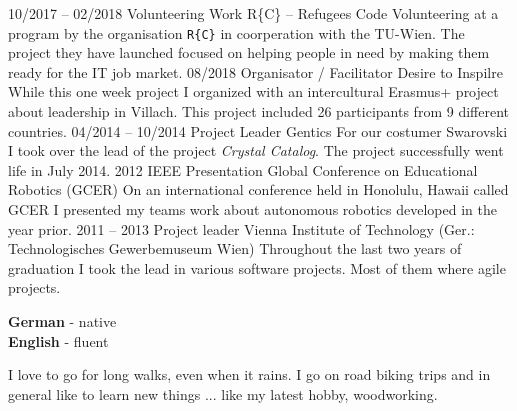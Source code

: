 \documentclass[9pt]{developercv} %
\begin{document}

\begin{entrylist}
	\entry
	{10/2017 -- 02/2018}
	{Volunteering Work}
	{R\{C\} -- Refugees Code}
	{Volunteering at a program by the organisation \texttt{R\{C\}} in coorperation with the TU-Wien. The project they have launched focused on helping people in need by making them ready for the IT job market.}
	\entry
	{08/2018}
	{Organisator / Facilitator}
	{Desire to Inspilre}
	{While this one week project I organized with  an intercultural Erasmus+ project about leadership in Villach. This project included 26 participants from 9 different countries.}
	\entry
	{04/2014 -- 10/2014}
	{Project Leader}
	{Gentics}
	{For our costumer Swarovski I took over the lead of the project \textit{Crystal Catalog}. The project successfully went life in July 2014.}
	\entry
	{2012}
	{IEEE Presentation}
	{Global Conference on Educational Robotics (GCER)}
	{On an international conference held in Honolulu, Hawaii called GCER I presented my teams work about autonomous robotics developed in the year prior.}
	\entry
	{2011 -- 2013}
	{Project leader}
	{Vienna Institute of Technology (Ger.: Technologisches Gewerbemuseum Wien)}
	{Throughout the last two years of graduation I took the lead in various software projects. Most of them where agile projects.}
\end{entrylist}


\begin{minipage}[t]{0.3\textwidth}
	\vspace{-\baselineskip} %

	

	\textbf{German} - native\\
	\textbf{English} - fluent\\
\end{minipage}
\hfill
\begin{minipage}[t]{0.6\textwidth}
	\vspace{-\baselineskip} %
	
	
	I love to go for long walks, even when it rains. I go on road biking trips and in general like to learn new things ... like my latest hobby, woodworking.
\end{minipage}
\hfill
%	
%	

\end{document}
